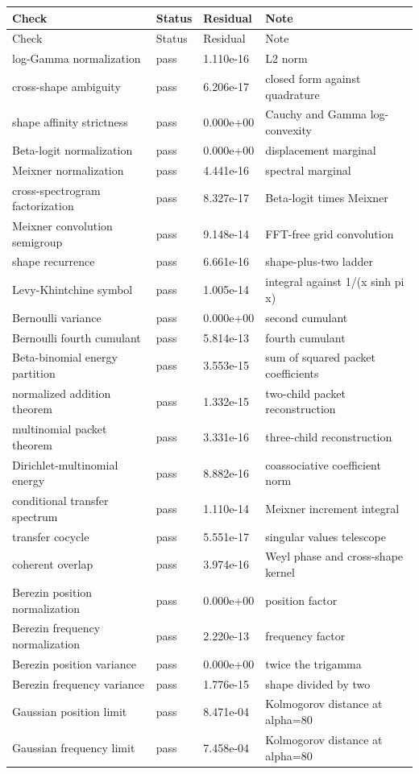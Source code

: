 \begin{longtable}{L{0.31\textwidth}L{0.08\textwidth}L{0.13\textwidth}L{0.37\textwidth}}
\toprule
Check & Status & Residual & Note \\
\midrule
\endfirsthead
\toprule
Check & Status & Residual & Note \\
\midrule
\endhead
log-Gamma normalization & pass & 1.110e-16 & L2 norm \\
cross-shape ambiguity & pass & 6.206e-17 & closed form against quadrature \\
shape affinity strictness & pass & 0.000e+00 & Cauchy and Gamma log-convexity \\
Beta-logit normalization & pass & 0.000e+00 & displacement marginal \\
Meixner normalization & pass & 4.441e-16 & spectral marginal \\
cross-spectrogram factorization & pass & 8.327e-17 & Beta-logit times Meixner \\
Meixner convolution semigroup & pass & 9.148e-14 & FFT-free grid convolution \\
shape recurrence & pass & 6.661e-16 & shape-plus-two ladder \\
Levy-Khintchine symbol & pass & 1.005e-14 & integral against 1/(x sinh pi x) \\
Bernoulli variance & pass & 0.000e+00 & second cumulant \\
Bernoulli fourth cumulant & pass & 5.814e-13 & fourth cumulant \\
Beta-binomial energy partition & pass & 3.553e-15 & sum of squared packet coefficients \\
normalized addition theorem & pass & 1.332e-15 & two-child packet reconstruction \\
multinomial packet theorem & pass & 3.331e-16 & three-child reconstruction \\
Dirichlet-multinomial energy & pass & 8.882e-16 & coassociative coefficient norm \\
conditional transfer spectrum & pass & 1.110e-14 & Meixner increment integral \\
transfer cocycle & pass & 5.551e-17 & singular values telescope \\
coherent overlap & pass & 3.974e-16 & Weyl phase and cross-shape kernel \\
Berezin position normalization & pass & 0.000e+00 & position factor \\
Berezin frequency normalization & pass & 2.220e-13 & frequency factor \\
Berezin position variance & pass & 0.000e+00 & twice the trigamma \\
Berezin frequency variance & pass & 1.776e-15 & shape divided by two \\
Gaussian position limit & pass & 8.471e-04 & Kolmogorov distance at alpha=80 \\
Gaussian frequency limit & pass & 7.458e-04 & Kolmogorov distance at alpha=80 \\
\bottomrule
\end{longtable}
